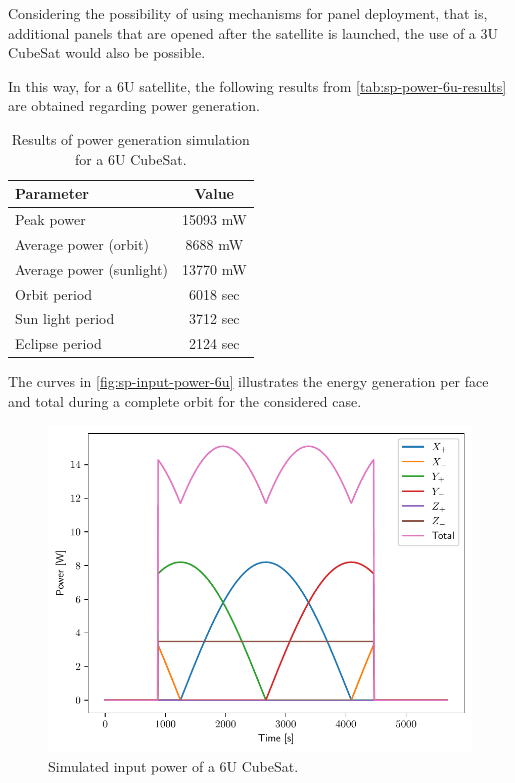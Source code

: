 Considering the possibility of using mechanisms for panel deployment, that is, additional panels that are opened after the satellite is launched, the use of a 3U CubeSat would also be possible.

In this way, for a 6U satellite, the following results from \autoref{tab:sp-power-6u-results} are obtained regarding power generation.

\begin{table}[!ht]
    \centering
    \begin{tabular}{lc}
        \toprule[1.5pt]
        \textbf{Parameter} & \textbf{Value} \\
        \midrule
        Peak power                  & 15093 mW \\
        Average power (orbit)       & 8688 mW \\
        Average power (sunlight)    & 13770 mW \\
        Orbit period                & 6018 sec \\
        Sun light period            & 3712 sec \\
        Eclipse period              & 2124 sec \\
        \bottomrule[1.5pt]
    \end{tabular}
    \caption{Results of power generation simulation for a 6U CubeSat.}
    \label{tab:sp-power-6u-results}
\end{table}

The curves in \autoref{fig:sp-input-power-6u} illustrates the energy generation per face and total during a complete orbit for the considered case.

\begin{figure}[!ht]
    \begin{center}
        \includegraphics[width=0.8\columnwidth]{curves/sp-input-power-6u}
        \caption{Simulated input power of a 6U CubeSat.}
        \label{fig:sp-input-power-6u}
    \end{center}
\end{figure}

